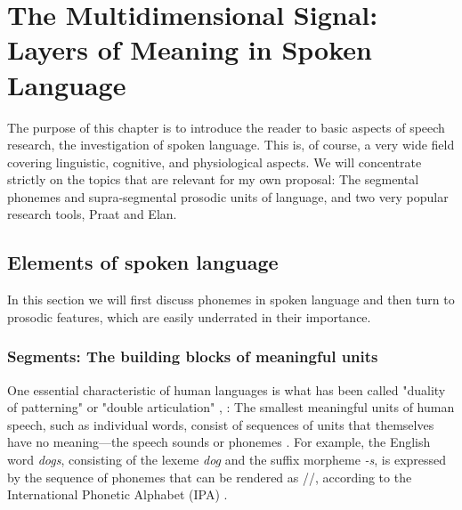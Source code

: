 
\chapter{The Multidimensional Signal: Layers of Meaning in Spoken Language}
\label{StateOfArt}

The purpose of this chapter is to introduce the reader to basic aspects of speech research, the investigation of spoken language. This is, of course, a very wide field covering linguistic, cognitive, and physiological aspects. We will concentrate strictly on the topics that are relevant for my own proposal: The segmental phonemes and supra-segmental prosodic units of language, and two very popular research tools, Praat and Elan. 

\section{Elements of spoken language}

In this section we will first discuss phonemes in spoken language and then turn to prosodic features, which are easily underrated in their importance. 

\subsection{Segments: The building blocks of meaningful units}

One essential characteristic of human languages is what has been called "duality of patterning" or "double articulation" \cite{hockett1958course}, \cite{martinet1960elements}: The smallest meaningful units of human speech, such as individual words, consist of sequences of units that themselves have no meaning—the speech sounds or phonemes \cite{hockett1958course}. For example, the English word \textit{dogs}, consisting of the lexeme \textit{dog} and the suffix morpheme \textit{-s}, is expressed by the sequence of phonemes that can be rendered as //, according to the International Phonetic Alphabet (IPA) \cite{internationalphoneticassociation1999ipa}. 

